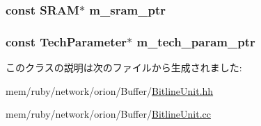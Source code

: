 \hypertarget{classBitlineUnit_aab5dce4213ab482c5e1909bfc96d62af}{
\subsubsection[{m\_\-sram\_\-ptr}]{\setlength{\rightskip}{0pt plus 5cm}const {\bf SRAM}$\ast$ {\bf m\_\-sram\_\-ptr}}}
\label{classBitlineUnit_aab5dce4213ab482c5e1909bfc96d62af}
\hypertarget{classBitlineUnit_a11d1644aa2bfe0e16783dface6fadf13}{
\subsubsection[{m\_\-tech\_\-param\_\-ptr}]{\setlength{\rightskip}{0pt plus 5cm}const {\bf TechParameter}$\ast$ {\bf m\_\-tech\_\-param\_\-ptr}}}
\label{classBitlineUnit_a11d1644aa2bfe0e16783dface6fadf13}


このクラスの説明は次のファイルから生成されました:\begin{DoxyCompactItemize}
\item 
mem/ruby/network/orion/Buffer/\hyperlink{BitlineUnit_8hh}{BitlineUnit.hh}\item 
mem/ruby/network/orion/Buffer/\hyperlink{BitlineUnit_8cc}{BitlineUnit.cc}\end{DoxyCompactItemize}
